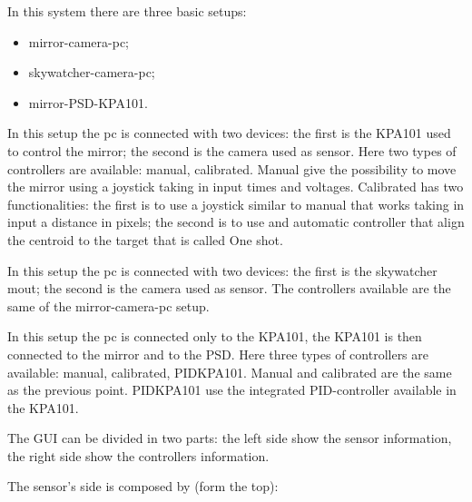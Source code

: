 In this system there are three basic setups:
\begin{itemize}
      \item mirror-camera-pc;
      \item skywatcher-camera-pc;
      \item mirror-PSD-KPA101.
\end{itemize}

In this setup the pc is connected with two devices: the first is
the KPA101 used to control the mirror; the second is the camera used as
sensor. Here two types of controllers are available: manual,
calibrated. Manual give the possibility to move the mirror using a joystick taking
in input times and voltages. Calibrated has two functionalities: the first is to use a joystick
similar to manual that works taking in input a distance in pixels; the
second is to use and automatic controller that align the centroid to the
target that is called One shot.

In this setup the pc is connected with two devices: the first is
the skywatcher mout; the second is the camera used as
sensor. The controllers available are the same of the mirror-camera-pc setup.

In this setup the pc is connected only to the KPA101, the KPA101 is
then connected to the mirror and to the PSD. Here three types of controllers are available: manual, calibrated, PIDKPA101. Manual and calibrated are the same as the previous point. PIDKPA101 use the integrated PID-controller available in the KPA101.



The GUI can be divided in two parts: the left side show the sensor
information, the right side show the controllers information.

The sensor's side is composed by (form the top):

